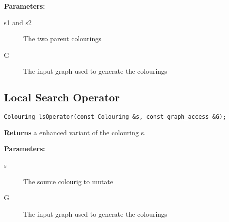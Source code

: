 \documentclass{scrartcl}
\begin{document}
\textbf{Parameters:}
\begin{description}
	\item[s1 and s2] The two parent colourings
	\item[G] The input graph used to generate the colourings
\end{description}

\subsection{Local Search Operator}

\begin{verbatim}
Colouring lsOperator(const Colouring &s, const graph_access &G);
\end{verbatim}

\textbf{Returns} a enhanced variant of the colouring s.

\textbf{Parameters:}
\begin{description}
	\item[s] The source colourig to mutate
	\item[G] The input graph used to generate the colourings
\end{description}
\end{document}
